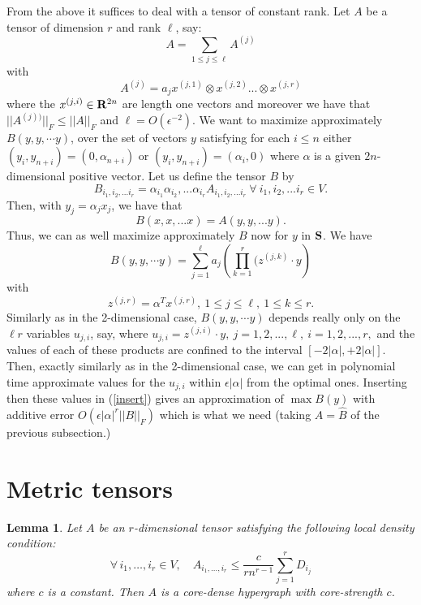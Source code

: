 \documentclass{book}
\newtheorem{lemma}[theorem]{Lemma}
\numberwithin{exercise}{chapter}
\begin{document}
From the above it suffices to deal with a tensor of constant
rank. Let $A$ be a tensor of dimension $r$ and rank $\ell$, say:
$$
A=\sum_{1\le j\le\ell}A^{(j)}
$$ with
$$
A^{(j)}=a_j x^{(j,1)}\otimes x^{(j,2)}...\otimes x^{(j,r)}
$$
where the $x^{(j,i)}\in {\bf R}^{2n}$ are length one vectors and
moreover we have that $||A^{(j))}||_F\le ||A||_F$ and $\ell=
O(\epsilon^{-2})$. We want to maximize approximately $B(y,y,\cdots
y)$, over the set of vectors $y$ satisfying for each $i\le n$
either $(y_i,y_{n+i})=(0,\alpha_{n+i})$ or
$(y_i,y_{n+i})=(\alpha_i,0)$ where $\alpha$ is a given
$2n$-dimensional positive vector. Let us define the tensor $B$ by
 $$
 B_{i_1,i_2,...i_r}=\alpha_{i_1}\alpha_{i_2},...\alpha_{i_r}A_{i_1,i_2,...i_r}
 ~\forall~ i_1,i_2,...i_r\in V.
 $$
 Then, with $y_j=\alpha_jx_j$, we have that
 $$
 B(x,x,...x)=A(y,y,...y).
 $$
Thus, we can as well maximize approximately $B$ now
 for $y$ in ${\bf S}$.
 We have
\begin{equation}\label{insert}
B(y,y,\cdots y)=\sum_{j=1}^{\ell}
a_j\left(\prod_{k=1}^r(z^{(j,k)}\cdot y\right)
\end{equation}
 with
 $$
z^{(j,r)}=\alpha^Tx^{(j,r)},~1\le j\le\ell,~1\le k\le r.
$$
 Similarly as in the 2-dimensional case, $B(y,y,\cdots y)$ depends
really only on the $\ell r$ variables $u_{j,i}$, say, where
$u_{j,i}=z^{(j,i)}\cdot y,~j=1,2,...,\ell,~i=1,2,...,r,$ and the
values of each of these products are confined to the interval
$[-2|\alpha|,+2|\alpha|]$. Then, exactly similarly as in the
2-dimensional case, we can get in polynomial time approximate
values for the $u_{j,i}$ within $\epsilon|\alpha|$ from the optimal
ones. Inserting then these values in
(\ref{insert}) gives an approximation of $\max B(y)$ with additive
error $O\left(\epsilon|\alpha|^r||B||_F\right)$ which is what we
need (taking $A={\hat B}$ of the previous subsection.)

\section{Metric tensors}\label{METRIC}

\begin{lemma}\label{lem:LOCAL}
Let $A$ be an $r$-dimensional tensor satisfying the following local density condition:
\[
\forall \, i_1, \ldots, i_r \in V, \quad A_{i_1,\ldots,i_r} \le \frac{c}{rn^{r-1}} \sum_{j=1}^r
D_{i_j}
\]
where $c$ is a constant. Then $A$ is a core-dense hypergraph with core-strength $c$.
\end{lemma}
\end{document}
